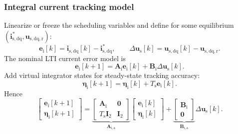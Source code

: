 \begin{frame}
	\frametitle{Integral current tracking model}
	Linearize or freeze the scheduling variables and define for some equilibrium $(\bm{i}_{\mathrm{s},\mathrm{dq}}^*,\bm{u}_{\mathrm{s},\mathrm{dq},\mathrm{r}})$:
	\begin{equation*}
		\bm{e}_{\mathrm{i}}[k]=\bm{i}_{\mathrm{s},\mathrm{dq}}[k]-\bm{i}_{\mathrm{s},\mathrm{dq}}^*,
		\qquad
		\Delta\bm{u}_{\mathrm{s}}[k]=\bm{u}_{\mathrm{s},\mathrm{dq}}[k]-\bm{u}_{\mathrm{s},\mathrm{dq},\mathrm{r}}.
	\end{equation*}\pause%
	The nominal LTI current error model is
	\begin{equation*}
		\bm{e}_{\mathrm{i}}[k+1]
		=\bm{A}_{\mathrm{i}}\bm{e}_{\mathrm{i}}[k]
		+\bm{B}_{\mathrm{i}}\Delta\bm{u}_{\mathrm{s}}[k].
	\end{equation*}\pause%
	Add virtual integrator states for steady-state tracking accuracy:
	\begin{equation*}
		\bm{\eta}_{\mathrm{i}}[k+1]
		=\bm{\eta}_{\mathrm{i}}[k]+T_{\mathrm{s}}\bm{e}_{\mathrm{i}}[k].
	\end{equation*}\pause%
	Hence
	\begin{equation*}
		\boxed{
			\begin{bmatrix}\bm{e}_{\mathrm{i}}[k+1]\\\bm{\eta}_{\mathrm{i}}[k+1]\end{bmatrix}
			=\underbrace{\begin{bmatrix}\bm{A}_{\mathrm{i}}&\bm{0}\\T_{\mathrm{s}}\bm{I}_2&\bm{I}_2\end{bmatrix}}_{\bm{A}_{\mathrm{i},\mathrm{a}}}
			\begin{bmatrix}\bm{e}_{\mathrm{i}}[k]\\\bm{\eta}_{\mathrm{i}}[k]\end{bmatrix}
			+\underbrace{\begin{bmatrix}\bm{B}_{\mathrm{i}}\\\bm{0}\end{bmatrix}}_{\bm{B}_{\mathrm{i},\mathrm{a}}}
			\Delta\bm{u}_{\mathrm{s}}[k].}
	\end{equation*}
\end{frame}


